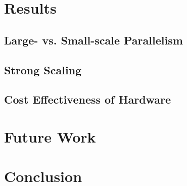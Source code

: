 \documentclass{acmsiggraph}
\begin{document}
\section{Results}

\subsection{Large- vs. Small-scale Parallelism}

\subsection{Strong Scaling}

\subsection{Cost Effectiveness of Hardware}

\section{Future Work}

\section{Conclusion}


\nocite{*}

\end{document}

